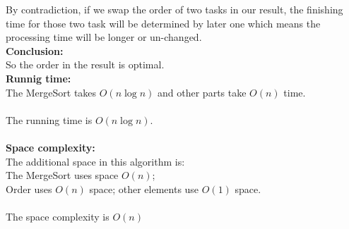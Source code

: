 \documentclass{article}
\begin{document}
By contradiction, if we swap the order of two tasks in our result, the finishing time for those two task will be determined by later one which means the processing time will be longer or un-changed.\\
\textbf{Conclusion:}\\
So the order in the result is optimal.\\
\textbf{\large Runnig time:\\}
The MergeSort takes $O(n\log n)$ and other parts take $O(n)$ time.\\\\
The running time is $O(n\log n).$\\\\
\textbf{\large Space complexity:\\}
The additional space in this algorithm is:\\
The MergeSort uses space $O(n)$;\\
Order uses $O(n)$ space; other elements use $O(1)$ space.\\\\
The space complexity is $O(n)$\\





\clearpage
\end{document}
